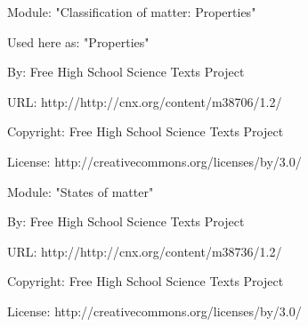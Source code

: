       \par\vspace{9pt}\noindent\begin{minipage}{\textwidth}
      Module: "Classification of matter: Properties" \par\nopagebreak\noindent
      Used here as: "Properties" \par\nopagebreak\noindent
        By: Free High School Science Texts Project\par\nopagebreak\noindent
      URL: http://http://cnx.org/content/m38706/1.2/\par\nopagebreak\noindent
      \par\nopagebreak\noindent
      Copyright: Free High School Science Texts Project\par\nopagebreak\noindent
      License:  http://creativecommons.org/licenses/by/3.0/\par\nopagebreak\noindent
      \par\end{minipage}
      \par\vspace{9pt}\noindent\begin{minipage}{\textwidth}
      Module: "States of matter" \par\nopagebreak\noindent
      By: Free High School Science Texts Project\par\nopagebreak\noindent
      URL: http://http://cnx.org/content/m38736/1.2/\par\nopagebreak\noindent
      \par\nopagebreak\noindent
      Copyright: Free High School Science Texts Project\par\nopagebreak\noindent
      License:  http://creativecommons.org/licenses/by/3.0/\par\nopagebreak\noindent
      \par\end{minipage}
